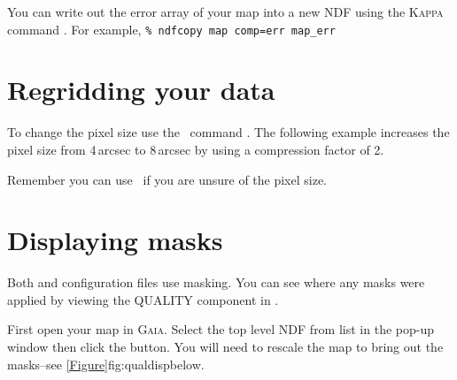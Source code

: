 \documentclass[11pt,oneside,chapters]{starlink}
\begin{document}
\begin{tip}

You can write out the error array of your map into a new NDF
using the \textsc{Kappa} command \ndfcopy. For example, \texttt{\% ndfcopy map comp=err map\_err}
\end{tip}





\section{Regridding your data}
\label{sec:regriddata}

To change the pixel size use the \Kappa\ command \compave. The following example
increases the pixel size from 4\,arcsec to 8\,arcsec by using a
compression factor of 2.

\begin{terminalv}
\end{terminalv}

\begin{tip}
Remember you can use \ndftrace\ if you are unsure of the pixel size.
\end{tip}



\section{Displaying masks}
\label{sec:maskshow}

Both  and
 configuration files use
masking. You can see where any masks were applied by viewing the
QUALITY component in \gaia.

First open your map in \textsc{Gaia}. Select the top level NDF from
list in the pop-up window then click the 
button. You will need to rescale the map to bring out the masks--see
\cref{Figure}{fig:qualdisp}{below}.
\end{document}
